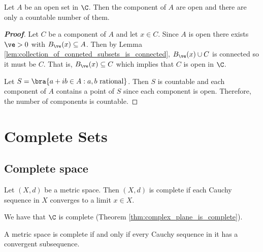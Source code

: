 


\begin{theorem}
Let $A$ be an open set in $\C$. Then the component of $A$ are open and there are only a countable number of them.
\end{theorem}

\begin{proof}[\bf Proof]%
Let $C$ be a component of $A$ and let $x\in C$. Since $A$ is open there exists $\ve>0$ with $B_\ve(x) \subseteq A$. Then by Lemma \ref{lem:collection_of_conneted_subsets_is_connected}, $B_\ve(x) \cup C$ is connected so it must be $C$. That is, $B_\ve(x) \subseteq C$ which implies that $C$ is open in $\C$.

Let $S = \bra{a+ib\in A:a,b\text{ rational}}$. Then $S$ is countable and each component of $A$ contains a point of $S$ since each component is open. Therefore, the number of components is countable.
\end{proof}




\section{Complete Sets}

\subsection{Complete space}

\begin{definition}
Let $(X,d)$ be a metric space. Then $(X,d)$ is complete if each Cauchy sequence in $X$ converges to a limit $x\in X$.
\end{definition}

\begin{remark}
We have that $\C$ is complete (Theorem \ref{thm:complex_plane_is_complete}).
\end{remark}


\begin{theorem}\label{thm:metric_complete_iff_cauchy_sequence_has_convergent_subsequence}
A metric space is complete if and only if every Cauchy sequence in it has a convergent subsequence.
\end{theorem}

